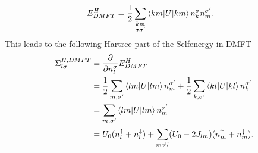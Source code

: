 \documentclass[12pt,a4paper]{scrartcl}
\numberwithin{equation}{section}
\begin{document}
\begin{align}
E^H_{DMFT}
&= \frac{1}{2}\sum_{\substack{km\\\sigma\sigma'}}
\braket{km|U|km}
n^{\sigma}_{k} n^{\sigma'}_{m}.
\end{align}
This leads to the following Hartree part of the Selfenergy in DMFT
\begin{align}
\Sigma^{H,DMFT}_{l\sigma}
&= \frac{\partial }{\partial n^{\sigma}_l} E^H_{DMFT} \\
&= \frac{1}{2} \sum_{m,\sigma'} \braket{lm|U|lm} n^{\sigma'}_{m}
+
\frac{1}{2} \sum_{k,\sigma'} \braket{kl|U|kl} n^{\sigma'}_{k} \\
%
&= \sum_{m,\sigma'} \braket{lm|U|lm} n^{\sigma'}_{m} \\
%
&= U_0 (n^{\uparrow}_l + n^{\downarrow}_l)
               + \sum_{m\neq l} (U_0-2J_{lm}) (n^{\uparrow}_m + n^{\downarrow}_m) .
\label{eq:hartree_selfenergy}
\end{align}
\end{document}
